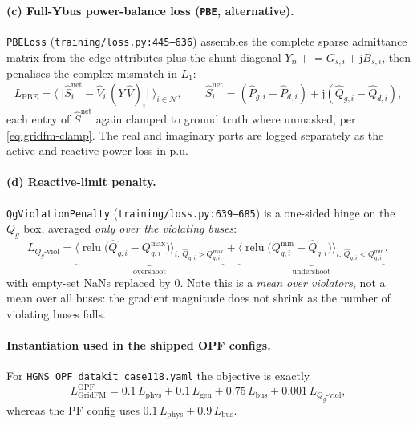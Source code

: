 \documentclass[11pt]{article}
\newcommand{\pred}[1]{\widehat{#1}}
\newcommand{\code}[1]{\texttt{\small #1}}
\newcommand{\relu}{\operatorname{relu}}
\begin{document}
\paragraph{(c) Full-Ybus power-balance loss (\code{PBE}, alternative).}
\code{PBELoss} (\code{training/loss.py:445--636}) assembles the complete sparse admittance
matrix from the edge attributes plus the shunt diagonal
$Y_{ii}\mathrel{+}= G_{s,i}+\mathrm{j}B_{s,i}$, then penalises the complex mismatch in
$L_1$:
\begin{equation}
\boxed{\;
L_{\mathrm{PBE}}
=\Big\langle\;\big| \pred{S}^{\mathrm{net}}_i - \pred{V}_i\,(\overline{Y}\,\overline{\pred{V}})_i \big|\;\Big\rangle_{i\in\mathcal{N}},
\qquad
\pred{S}^{\mathrm{net}}_i=(\pred{P}_{g,i}-\pred{P}_{d,i})+\mathrm{j}(\pred{Q}_{g,i}-\pred{Q}_{d,i}),
\;}
\label{eq:gridfm-pbe}
\end{equation}
each entry of $\pred{S}^{\mathrm{net}}$ again clamped to ground truth where unmasked, per
\eqref{eq:gridfm-clamp}. The real and imaginary parts are logged separately as the active
and reactive power loss in p.u.

\paragraph{(d) Reactive-limit penalty.}
\label{sec:gridfm-qviol}
\code{QgViolationPenalty} (\code{training/loss.py:639--685}) is a one-sided hinge on the
$Q_g$ box, averaged \emph{only over the violating buses}:
\begin{equation}
\boxed{\;
L_{Q_g\text{-viol}}
=\underbrace{\Big\langle \relu\!\big(\pred{Q}_{g,i}-Q^{\max}_{g,i}\big)\Big\rangle_{i:\,\pred{Q}_{g,i}>Q^{\max}_{g,i}}}_{\text{overshoot}}
+\underbrace{\Big\langle \relu\!\big(Q^{\min}_{g,i}-\pred{Q}_{g,i}\big)\Big\rangle_{i:\,\pred{Q}_{g,i}<Q^{\min}_{g,i}}}_{\text{undershoot}} ,
\;}
\label{eq:gridfm-qviol}
\end{equation}
with empty-set NaNs replaced by $0$. Note this is a \emph{mean over violators}, not a mean
over all buses: the gradient magnitude does not shrink as the number of violating buses
falls.

\paragraph{Instantiation used in the shipped OPF configs.}
For \code{HGNS\_OPF\_datakit\_case118.yaml} the objective is exactly
\begin{equation}
L_{\mathrm{GridFM}}^{\mathrm{OPF}}
= 0.1\,L_{\mathrm{phys}}
+ 0.1\,L_{\mathrm{gen}}
+ 0.75\,L_{\mathrm{bus}}
+ 0.001\,L_{Q_g\text{-viol}} ,
\label{eq:gridfm-instance}
\end{equation}
whereas the PF config uses $0.1\,L_{\mathrm{phys}}+0.9\,L_{\mathrm{bus}}$.
\end{document}

